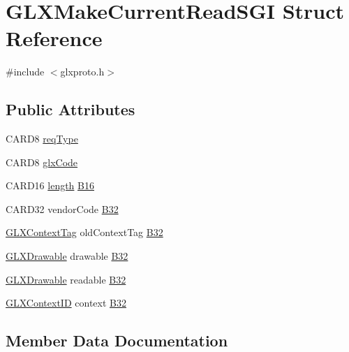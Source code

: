 \hypertarget{struct_g_l_x_make_current_read_s_g_i}{}\section{G\+L\+X\+Make\+Current\+Read\+S\+GI Struct Reference}
\label{struct_g_l_x_make_current_read_s_g_i}


{\ttfamily \#include $<$glxproto.\+h$>$}

\subsection*{Public Attributes}
\begin{DoxyCompactItemize}
\item 
C\+A\+R\+D8 \hyperlink{struct_g_l_x_make_current_read_s_g_i_a04b0f30bdeddc0f04cb4295a9d3f3bbb}{req\+Type}
\item 
C\+A\+R\+D8 \hyperlink{struct_g_l_x_make_current_read_s_g_i_af9b0395a9604d785943fc7582dd3b1c5}{glx\+Code}
\item 
C\+A\+R\+D16 \hyperlink{glcorearb_8h_ab9c919755bde3b34349e23a32b4e0fa7}{length} \hyperlink{struct_g_l_x_make_current_read_s_g_i_a9a595f9685e71583db20bd71c96d69c8}{B16}
\item 
C\+A\+R\+D32 vendor\+Code \hyperlink{struct_g_l_x_make_current_read_s_g_i_afdaa439e8732b4621b4b5ff2d9de8216}{B32}
\item 
\hyperlink{glxproto_8h_ae71763ce00c9fa460beb4699af678691}{G\+L\+X\+Context\+Tag} old\+Context\+Tag \hyperlink{struct_g_l_x_make_current_read_s_g_i_a57eb7de8965b883a7047a635e2318196}{B32}
\item 
\hyperlink{glx_8h_a826f51745d9d6c81bdbac47ae2b80cf7}{G\+L\+X\+Drawable} drawable \hyperlink{struct_g_l_x_make_current_read_s_g_i_a56cdf9afe1f222df7615a734b298b658}{B32}
\item 
\hyperlink{glx_8h_a826f51745d9d6c81bdbac47ae2b80cf7}{G\+L\+X\+Drawable} readable \hyperlink{struct_g_l_x_make_current_read_s_g_i_ab0be6b8dc8e77c718815f10c07b6f173}{B32}
\item 
\hyperlink{glx_8h_a17c7ca5b76cc448032df0b5352803005}{G\+L\+X\+Context\+ID} context \hyperlink{struct_g_l_x_make_current_read_s_g_i_a5442e252cb2a3f76ef126e8954120a06}{B32}
\end{DoxyCompactItemize}


\subsection{Member Data Documentation}
\mbox{\label{struct_g_l_x_make_current_read_s_g_i_a9a595f9685e71583db20bd71c96d69c8}} 
